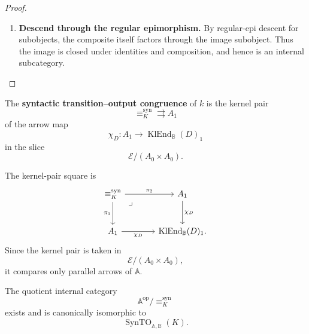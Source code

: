 \begin{proof}
\begin{enumerate}
        After this pullback, a composable pair in the image is represented by a
        composable pair in \(\mathbb A^{\mathrm{op}}\). Since \(\chi_D\) is an
        internal functor, the composite in
        \(\operatorname{KlEnd}_{\mathbb B}(D)\) is the image under \(\chi_D\)
        of the composite in \(\mathbb A^{\mathrm{op}}\). Therefore, after
        precomposition with a regular epimorphism, the composite lands in the
        image subobject.

        \item \textbf{Descend through the regular epimorphism.}
        By regular-epi descent for subobjects, the composite itself factors
        through the image subobject. Thus the image is closed under identities
        and composition, and hence is an internal subcategory.
    \end{enumerate}
\end{proof}

\begin{definition}
\label{def:syn-to-syntactic-congruence}
    The \textbf{syntactic transition--output congruence} of \(k\) is the kernel
    pair
    \[
        {\equiv_K^{\mathrm{syn}}}
        \rightrightarrows
        A_1
    \]
    of the arrow map
    \[
        \chi_D:
        A_1\to
        \operatorname{KlEnd}_{\mathbb B}(D)_1
    \]
    in the slice
    \[
        \mathcal E/(A_0\times A_0).
    \]
\end{definition}

The kernel-pair square is
\[
\begin{tikzcd}[column sep=large, row sep=large]
    {\equiv_K^{\mathrm{syn}}}
        \arrow[r, "\pi_2"]
        \arrow[d, "\pi_1"']
        \arrow[dr, phantom, "\lrcorner", very near start]
    &
    A_1
        \arrow[d, "\chi_D"]
    \\
    A_1
        \arrow[r, "\chi_D"']
    &
    \operatorname{KlEnd}_{\mathbb B}(D)_1 .
\end{tikzcd}
\]
Since the kernel pair is taken in
\[
    \mathcal E/(A_0\times A_0),
\]
it compares only parallel arrows of \(\mathbb A\).

\begin{theorem}
\label{thm:syn-to-syntactic-quotient}
    The quotient internal category
    \[
        \mathbb A^{\mathrm{op}}/{\equiv_K^{\mathrm{syn}}}
    \]
    exists and is canonically isomorphic to
    \[
        \operatorname{SynTO}_{\mathbb A,\mathbb B}(K).
    \]
\end{theorem}

